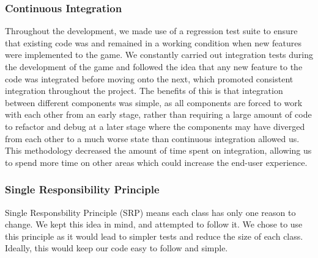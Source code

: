 \documentclass[12pt]{article}
\begin{document}
\subsubsection{Continuous Integration}	
Throughout the development, we made use of a regression test suite to ensure that existing code was and remained in a working condition when new features were implemented to the game. We constantly carried out integration tests during the development of the game and followed the idea that any new feature to the code was integrated before moving onto the next, which promoted consistent integration throughout the project. The benefits of this is that integration between different components was simple, as all components are forced to work with each other from an early stage, rather than requiring a large amount of code to refactor and debug at a later stage where the components may have diverged from each other to a much worse state than continuous integration allowed us. This methodology decreased the amount of time spent on integration, allowing us to spend more time on other areas which could increase the end-user experience.
\subsubsection{Single Responsibility Principle}
Single Responsbility Principle (SRP) means each class has only one reason to change. We kept this idea in mind, and attempted to follow it. We chose to use this principle as it would lead to simpler tests and reduce the size of each class. Ideally, this would keep our code easy to follow and simple.
\newpage
\end{document}
